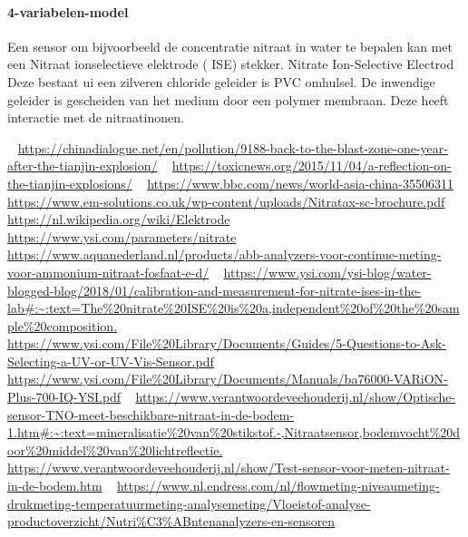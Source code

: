 \documentclass{article}
\begin{document}
\paragraph{4-variabelen-model}

Een sensor om bijvoorbeeld de concentratie  nitraat in water te bepalen kan met een Nitraat ionselectieve elektrode ( ISE) stekker. Nitrate Ion-Selective Electrod
Deze bestaat ui een zilveren chloride geleider is PVC omhulsel. De inwendige geleider is gescheiden van het medium door een polymer membraan. Deze heeft interactie met de nitraatinonen.

~\cite{chinadialogue}
\url{https://chinadialogue.net/en/pollution/9188-back-to-the-blast-zone-one-year-after-the-tianjin-explosion/}
~\cite{toxicnewsreflection}
\url{https://toxicnews.org/2015/11/04/a-reflection-on-the-tianjin-explosions/}
~\cite{worldasia35506311}
\url{https://www.bbc.com/news/world-asia-china-35506311}
~\cite{nitratax}
\url{https://www.em-solutions.co.uk/wp-content/uploads/Nitratax-sc-brochure.pdf}
~\cite{elektrode}
\url{https://nl.wikipedia.org/wiki/Elektrode}
~\cite{nitrate}
\url{https://www.ysi.com/parameters/nitrate}
~\cite{abbanalyse}
\url{https://www.aquanederland.nl/products/abb-analyzers-voor-continue-meting-voor-ammonium-nitraat-fosfaat-e-d/}
~\cite{kallibratiemeting}
\url{https://www.ysi.com/ysi-blog/water-blogged-blog/2018/01/calibration-and-measurement-for-nitrate-ises-in-the-lab#:~:text=The%20nitrate%20ISE%20is%20a,independent%20of%20the%20sample%20composition.}
~\cite{questuvsensor}
\url{https://www.ysi.com/File%20Library/Documents/Guides/5-Questions-to-Ask-Selecting-a-UV-or-UV-Vis-Sensor.pdf}
~\cite{libmanual}
\url{https://www.ysi.com/File%20Library/Documents/Manuals/ba76000-VARiON-Plus-700-IQ-YSI.pdf}
~\cite{nitraatsensor}
\url{https://www.verantwoordeveehouderij.nl/show/Optische-sensor-TNO-meet-beschikbare-nitraat-in-de-bodem-1.htm#:~:text=mineralisatie%20van%20stikstof.-,Nitraatsensor,bodemvocht%20door%20middel%20van%20lichtreflectie.}
~\cite{testsenor}
\url{https://www.verantwoordeveehouderij.nl/show/Test-sensor-voor-meten-nitraat-in-de-bodem.htm}
~\cite{flowmeting}
\url{https://www.nl.endress.com/nl/flowmeting-niveaumeting-drukmeting-temperatuurmeting-analysemeting/Vloeistof-analyse-productoverzicht/Nutri%C3%ABntenanalyzers-en-sensoren}
\end{document}
